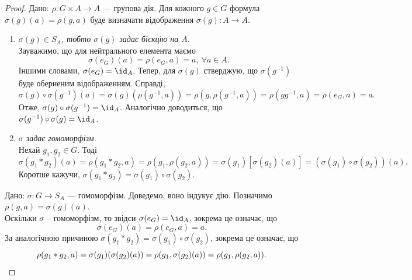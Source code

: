 \documentclass{math_library}
\begin{document}
\begin{proof}
\rightproof Дано: $\rho \colon G \times A \to A$ --- групова дія. Для кожного $g \in G$ формула $\sigma(g)(a) = \rho(g,a)$ буде визначати відображення $\sigma(g) \colon A \to A$.
\begin{enumerate}[wide=0pt,label={\Roman*.}]
\item \textit{$\sigma(g) \in S_A$, тобто $\sigma(g)$ задає бієкцію на $A$}.\\
Зауважимо, що для нейтрального елемента маємо
\[
\sigma(e_G)(a) = \rho(e_G,a) = a,\ \forall a \in A.
\]
Іншими словами, $\sigma(e_G) = \id_A$. Тепер, для $\sigma(g)$ стверджую, що $\sigma(g^{-1})$ буде оберненим відображенням. Справді,
\[
\sigma(g) \circ \sigma(g^{-1}) (a) = \sigma(g)(\rho(g^{-1},a)) = \rho(g, \rho(g^{-1},a)) = \rho(gg^{-1},a) = \rho(e_G,a) = a.
\]
Отже, $\sigma(g) \circ \sigma(g^{-1}) = \id_A$. Аналогічно доводиться, що $\sigma(g^{-1}) \circ \sigma(g) = \id_A$.

\item \textit{$\sigma$ задає гомоморфізм}.\\
Нехай $g_1, g_2 \in G$. Тоді
\[
\sigma (g_1*g_2)(a) = \rho(g_1*g_2,a) = \rho(g_1, \rho(g_2,a)) = \sigma(g_1)[\sigma(g_2)(a)] = (\sigma(g_1) \circ \sigma(g_2))(a).
\]
Коротше кажучи, $\sigma(g_1*g_2) = \sigma(g_1) \circ \sigma(g_2)$.
\end{enumerate}
\leftproof Дано: $\sigma \colon G \to S_A$ --- гомоморфізм. Доведемо, воно індукує дію. Позначимо $\rho(g,a) = \sigma(g)(a)$.\\
Оскільки $\sigma$ -- гомоморфізм, то звідси $\sigma(e_G) = \id_A$, зокрема це означає, що
\[
\sigma(e_G)(a) = \rho(e_G,a) = a.
\]
За аналогічною причиною $\sigma(g_1*g_2) = \sigma(g_1) \circ \sigma(g_2)$, зокрема це означає, що
\[
\rho(g_1*g_2,a) = \sigma(g_1)(\sigma(g_2)(a)) = \rho(g_1, \sigma(g_2)(a)) = \rho(g_1, \rho(g_2,a)). \qedhere
\]
\end{proof}
\end{document}
